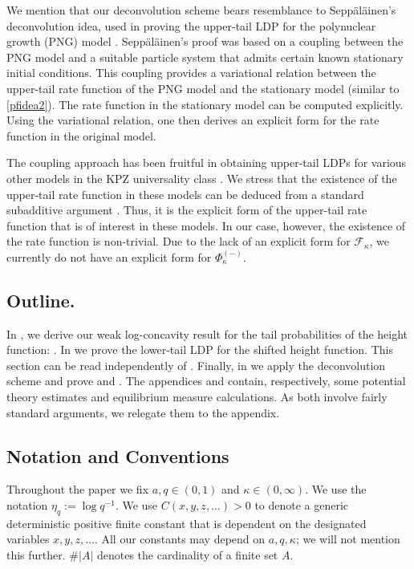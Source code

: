 \documentclass[reqno,11pt]{amsart}
\newcommand{\aw}{a}
\newcommand{\Con}{C}
\newcommand{\logq}{\eta_q}
\numberwithin{equation}{section}
\theoremstyle{definition}
\begin{document}
\medskip

{We mention that our deconvolution scheme bears resemblance to Seppäläinen's deconvolution idea, used in proving the upper-tail LDP for the polynuclear growth (PNG) model \cite{seppalainen_98_increasing}. Seppäläinen's proof was based on a coupling between the PNG model and a suitable particle system that admits certain known stationary initial conditions. This coupling provides a variational relation between the upper-tail rate function of the PNG model and the stationary model (similar to \eqref{pfidea2}). The rate function in the stationary model can be computed explicitly. Using the variational relation, one then derives an explicit form for the rate function in the original model.} 
 
 {The coupling approach has been fruitful in obtaining upper-tail LDPs for various other models in the KPZ universality class \cite{sepp98mprf,georgiou2013large,janjigian2015large,emrah,ciech,jan19}. We stress that the existence of the upper-tail rate function in these models can be deduced from a standard subadditive argument \cite{kesten}. Thus, it is the explicit form of the upper-tail rate function that is of interest in these models. In our case, however, the existence of the rate function is non-trivial. Due to the lack of an explicit form for $\mathcal{F}_\kappa$, we currently do not have an explicit form for $\Phi_\kappa^{(-)}$.}

\subsection*{Outline.} In , we derive our weak log-concavity result for the tail probabilities of the height function: . In  we prove the lower-tail LDP for the shifted height function.  This section can be read independently of . Finally, in  we apply the deconvolution scheme and prove  and .
The appendices  and  contain, respectively, some potential theory estimates and equilibrium measure calculations. As both involve fairly standard arguments, we relegate them to the appendix.

\subsection*{Notation and Conventions} Throughout the paper we fix $\aw,q\in (0,1)$ and $\kappa\in (0,\infty)$. We use the notation $\logq:=\log q^{-1}$. We use $\Con(x,y,z,\ldots)>0$ to denote a generic
deterministic positive finite constant that is dependent on the designated variables $x,y,z,\ldots.$ All our constants may depend on $a,q,\kappa$; we will not mention this further. $\#|A|$ denotes the cardinality of a finite set $A$.
\end{document}
